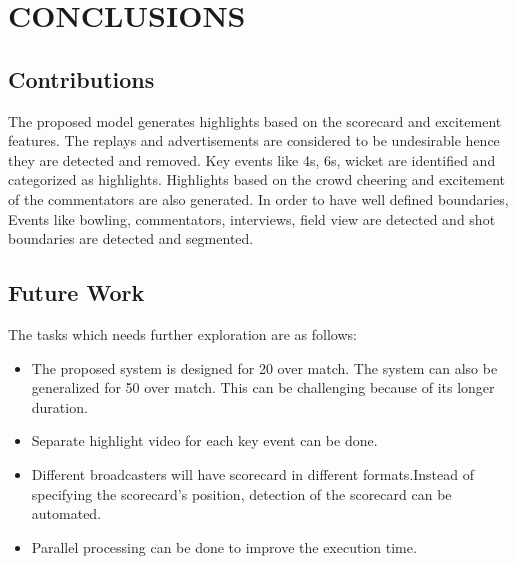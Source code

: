 
\chapter{CONCLUSIONS} %
\section{Contributions}
The proposed model generates highlights based on the scorecard and excitement features. The replays and advertisements are considered to be undesirable hence they are detected and removed. Key events like 4s, 6s, wicket are identified and categorized as highlights. Highlights based on the crowd cheering and excitement of the commentators are also generated. In order to have well defined boundaries, Events like bowling, commentators, interviews, field view are detected and shot boundaries are detected and segmented.

\section{Future Work}
The tasks which needs further exploration are as follows:
\begin{itemize}
    \item The proposed system is designed for 20 over match. The system can also be generalized for 50 over match. This can be challenging because of its longer duration.
    \item Separate highlight video for each key event can be done. \item Different broadcasters will have scorecard in different formats.Instead of specifying the scorecard's position, detection of the scorecard can be automated.
    \item Parallel processing can be done to improve the execution time.
\end{itemize}


